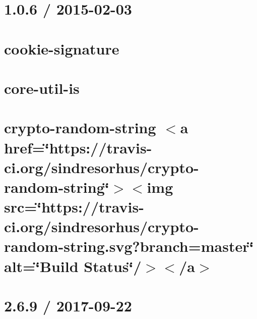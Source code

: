 \let\mypdfximage\pdfximage\def\pdfximage{\immediate\mypdfximage}\documentclass[twoside]{book}
\newcommand{\+}{\discretionary{\mbox{\scriptsize$\hookleftarrow$}}{}{}}
\begin{document}
\chapter{1.0.6 / 2015-\/02-\/03}
\label{md__c_1__git_hub__p_r_o_y_e_c_t_o-_i_i_i-_g_o_t_rest-api-node-mysql_node_modules_cookie-signature__history}

\chapter{cookie-\/signature}
\label{md__c_1__git_hub__p_r_o_y_e_c_t_o-_i_i_i-_g_o_t_rest-api-node-mysql_node_modules_cookie-signature__readme}

\chapter{core-\/util-\/is}
\label{md__c_1__git_hub__p_r_o_y_e_c_t_o-_i_i_i-_g_o_t_rest-api-node-mysql_node_modules_core-util-is__r_e_a_d_m_e}

\chapter{crypto-\/random-\/string $<$a href=\char`\"{}https\+://travis-\/ci.\+org/sindresorhus/crypto-\/random-\/string\char`\"{}$>$$<$img src=\char`\"{}https\+://travis-\/ci.\+org/sindresorhus/crypto-\/random-\/string.\+svg?branch=master\char`\"{} alt=\char`\"{}\+Build Status\char`\"{}/$>$$<$/a$>$}
\label{md__c_1__git_hub__p_r_o_y_e_c_t_o-_i_i_i-_g_o_t_rest-api-node-mysql_node_modules_crypto-random-string_readme}

\chapter{2.6.9 / 2017-\/09-\/22}
\label{md__c_1__git_hub__p_r_o_y_e_c_t_o-_i_i_i-_g_o_t_rest-api-node-mysql_node_modules_debug__c_h_a_n_g_e_l_o_g}

\end{document}
